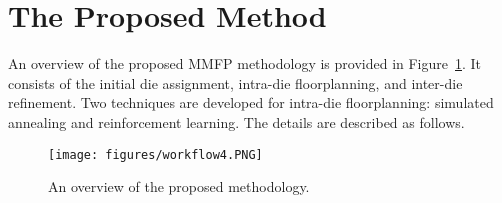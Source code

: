 \section{The Proposed Method}
\label{sec:method}

An overview of the proposed MMFP methodology is provided in Figure~\ref{fig:workflow}. It consists of the initial die assignment, intra-die floorplanning, and inter-die refinement. Two techniques are developed for intra-die floorplanning: simulated annealing and reinforcement learning. The details are described as follows.

\begin{figure}[ht] 
\centering
\vspace{-3mm}
\texttt{[image: figures/workflow4.PNG]}
\caption{An overview of the proposed methodology.}
\label{fig:workflow}
\vspace{-4mm}
\end{figure}





